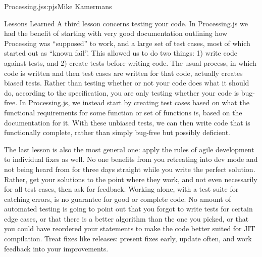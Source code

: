\begin{aosachapter}{Processing.js}{s:pjs}{Mike Kamermans}
\begin{aosasect1}{Lessons Learned}
A third lesson concerns testing your code. In Processing.js we had the
benefit of starting with very good documentation outlining how
Processing was ``supposed'' to work, and a large set of test cases, most
of which started out as ``known fail''. This allowed us to do two things:
1) write code against tests, and 2) create tests before writing
code. The usual process, in which code is written and then test
cases are written for that code, actually creates biased tests. Rather than
testing whether or not your code does what it should do, according to
the specification, you are only testing whether your code is
bug-free. In Processing.js, we instead start by creating test cases
based on what the functional requirements for some function or set of
functions is, based on the documentation for it. With these unbiased
tests, we can then write code that is functionally complete, rather
than simply bug-free but possibly deficient.

The last lesson is also the most general one: apply the rules of agile
development to individual fixes as well. No one benefits from you
retreating into dev mode and not being heard from for three days
straight while you write the perfect solution. Rather, get your
solutions to the point where they work, and not even necessarily for
all test cases, then ask for feedback. Working alone, with a test
suite for catching errors, is no guarantee for good or complete
code. No amount of automated testing is going to point out that you
forgot to write tests for certain edge cases, or that there is a
better algorithm than the one you picked, or that you could have
reordered your statements to make the code better suited for JIT
compilation. Treat fixes like releases: present fixes early, update
often, and work feedback into your improvements.

\end{aosasect1}

\end{aosachapter}
